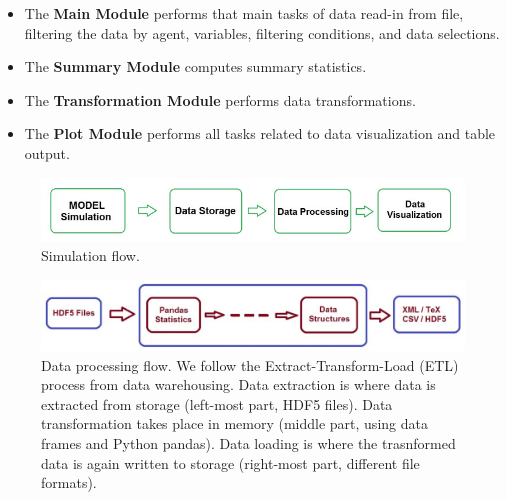 \documentclass[10pt,a4paper]{article}
\begin{document}
\begin{itemize}
\item The \textbf{Main Module} performs that main tasks of data read-in from file, filtering the data by agent, variables, filtering conditions, and data selections.

\item The \textbf{Summary Module} computes summary statistics.

\item The \textbf{Transformation Module} performs data transformations.

\item The \textbf{Plot Module} performs all tasks related to data visualization and table output.
\end{itemize}


\begin{figure}
\graphicspath{{./png/}}
%
\begin{boxedminipage}{14cm}
\centering\leavevmode
\includegraphics[scale=1]{simulation_workflow.pdf} 
\end{boxedminipage}
\label{Fig: Simulation workflow}
\caption{\footnotesize Simulation flow.}
\end{figure}

\begin{figure}
\centering\leavevmode
\graphicspath{{./png/}}
%
\begin{boxedminipage}{14cm}
\centering\leavevmode
\includegraphics[scale=.5]{data_processing.pdf} 
\end{boxedminipage}
\label{Fig: Data processing}
\caption{\footnotesize Data processing flow. We follow the Extract-Transform-Load (ETL) process from data warehousing. Data extraction is where data is extracted from storage (left-most part, HDF5 files). Data transformation takes place in memory (middle part, using data frames and Python pandas). Data loading is where the trasnformed data is again written to storage (right-most part, different file formats).}
\end{figure}
\end{document}
